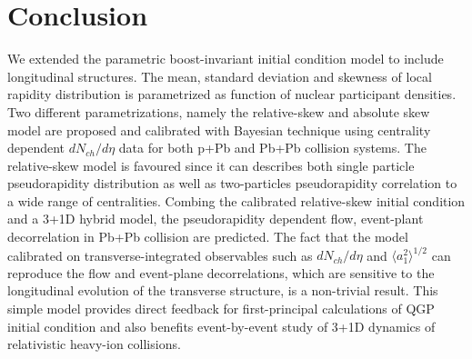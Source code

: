\documentclass[3p,times,twocolumn]{elsarticle}
\begin{document}
\section{Conclusion}
\label{Conclusion}
We extended the parametric boost-invariant initial condition model \trento to include longitudinal structures.
The mean, standard deviation and skewness of local rapidity distribution is parametrized as function of nuclear participant densities.
Two different parametrizations, namely the relative-skew and absolute skew model are proposed and calibrated with Bayesian technique using centrality dependent $dN_{ch}/d\eta$ data for both p+Pb and Pb+Pb collision systems.
The relative-skew model is favoured since it can describes both single particle pseudorapidity distribution as well as two-particles pseudorapidity correlation to a wide range of centralities.
Combing the calibrated relative-skew initial condition and a 3+1D hybrid model, the pseudorapidity dependent flow, event-plant decorrelation in Pb+Pb collision are predicted.
The fact that the model calibrated on transverse-integrated observables such as $dN_{ch}/d\eta$ and $\langle a_1^2\rangle^{1/2}$ can reproduce the flow and event-plane decorrelations, which are sensitive to the longitudinal evolution of the transverse structure, is a non-trivial result.
This simple model provides direct feedback for first-principal calculations of QGP initial condition and also benefits event-by-event study of 3+1D dynamics of relativistic heavy-ion collisions. 












\end{document}
